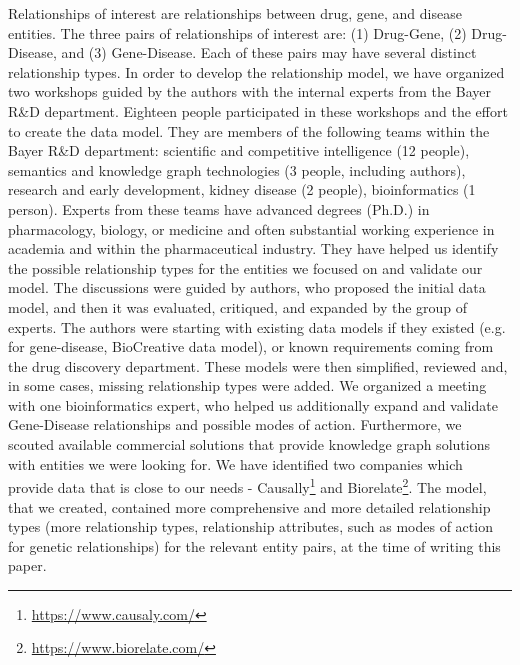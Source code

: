 \documentclass[final,12pt,3p,times,twocolumn,authoryear]{elsarticle}
\begin{document}
Relationships of interest are relationships between drug, gene, and disease entities. The three pairs of relationships of interest are: (1) Drug-Gene, (2) Drug-Disease, and (3) Gene-Disease. Each of these pairs may have several distinct relationship types. In order to develop the relationship model, we have organized two workshops guided by the authors with the internal experts from the Bayer R\&D department. Eighteen people participated in these workshops and the effort to create the data model. They are members of the following teams within the Bayer R\&D department: scientific and competitive intelligence (12 people), semantics and knowledge graph technologies (3 people, including authors), research and early development, kidney disease (2 people), bioinformatics (1 person). Experts from these teams have advanced degrees (Ph.D.) in pharmacology, biology, or medicine and often substantial working experience in academia and within the pharmaceutical industry. They have helped us identify the possible relationship types for the entities we focused on and validate our model. The discussions were guided by authors, who proposed the initial data model, and then it was evaluated, critiqued, and expanded by the group of experts. The authors were starting with existing data models if they existed (e.g. for gene-disease, BioCreative data model), or known requirements coming from the drug discovery department. These models were then simplified, reviewed and, in some cases, missing relationship types were added. We organized a meeting with one bioinformatics expert, who helped us additionally expand and validate Gene-Disease relationships and possible modes of action. Furthermore, we scouted available commercial solutions that provide knowledge graph solutions with entities we were looking for. We have identified two companies which provide data that is close to our needs - Causally\footnote{\url{https://www.causaly.com/}} and Biorelate\footnote{\url{https://www.biorelate.com/}}. The model, that we created, contained more comprehensive and more detailed relationship types (more relationship types, relationship attributes, such as modes of action for genetic relationships) for the relevant entity pairs, at the time of writing this paper.  
\end{document}
